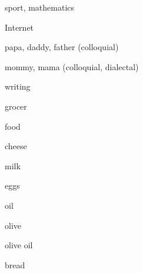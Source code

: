 \begin{flashcard}{\LARGE sport, mathematics}
\LARGE {}
\end{flashcard}
\begin{flashcard}{\LARGE Internet}
\LARGE {}
\end{flashcard}
\begin{flashcard}{\LARGE papa, daddy, father (colloquial)}
\LARGE {}
\end{flashcard}
\begin{flashcard}{\LARGE mommy, mama (colloquial, dialectal)}
\LARGE {}
\end{flashcard}
\begin{flashcard}{\LARGE writing}
\LARGE {}
\end{flashcard}
\begin{flashcard}{\LARGE grocer}
\LARGE {}
\end{flashcard}
\begin{flashcard}{\LARGE food}
\LARGE {}
\end{flashcard}
\begin{flashcard}{\LARGE cheese}
\LARGE {}
\end{flashcard}
\begin{flashcard}{\LARGE milk}
\LARGE {}
\end{flashcard}
\begin{flashcard}{\LARGE eggs}
\LARGE {}
\end{flashcard}
\begin{flashcard}{\LARGE oil}
\LARGE {}
\end{flashcard}
\begin{flashcard}{\LARGE olive}
\LARGE {}
\end{flashcard}
\begin{flashcard}{\LARGE olive oil}
\LARGE {}
\end{flashcard}
\begin{flashcard}{\LARGE bread}
\LARGE {}
\end{flashcard}
